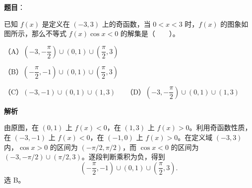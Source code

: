 \begin{answer}

\textbf{题目}：

已知 \(f(x)\) 是定义在 \((-3,3)\) 上的奇函数，当 \(0<x<3\) 时，\(f(x)\) 的图象如图所示，那么不等式 \(f(x)\cos x<0\) 的解集是\mbox{（　　）}。
\nopagebreak[4]
\begin{center}\end{center}
\nopagebreak[4]
（A）\(\left(-3,-\dfrac\pi2\right)\cup(0,1)\cup\left(\dfrac\pi2,3\right)\)

（B）\(\left(-\dfrac\pi2,-1\right)\cup(0,1)\cup\left(\dfrac\pi2,3\right)\)

（C）\((-3,-1)\cup(0,1)\cup(1,3)\)　　（D）\(\left(-3,-\dfrac\pi2\right)\cup(0,1)\cup(1,3)\)

\textbf{解析}

由原图，在 \((0,1)\) 上 \(f(x)<0\)，在 \((1,3)\) 上 \(f(x)>0\)。利用奇函数性质，在 \((-3,-1)\) 上 \(f(x)<0\)，在 \((-1,0)\) 上 \(f(x)>0\)。在定义域 \((-3,3)\) 内，\(\cos x>0\) 的区间为 \((-\pi/2,\pi/2)\)，而 \(\cos x<0\) 的区间为 \((-3,-\pi/2)\cup(\pi/2,3)\)。逐段判断乘积为负，得到
\nopagebreak[4]
\[
\left(-\frac\pi2,-1\right)\cup(0,1)\cup\left(\frac\pi2,3\right).
\]
选 B。


\end{answer}

